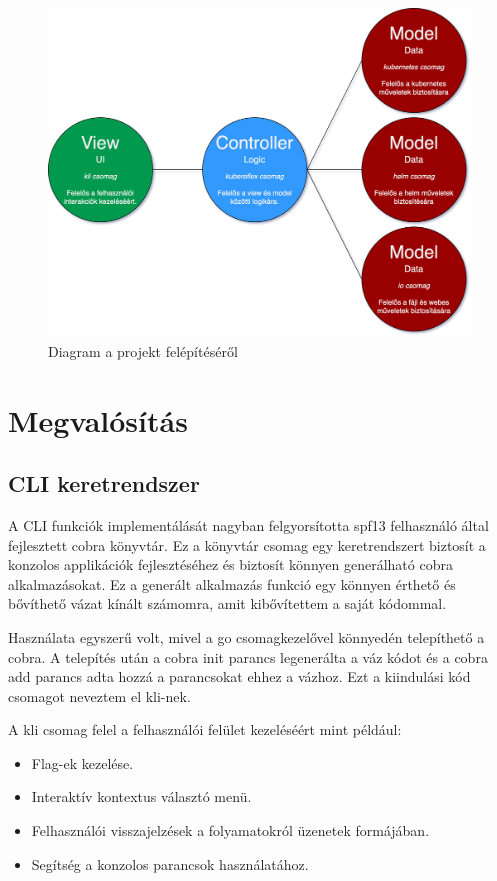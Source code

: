 \begin{figure}[ht]
  \centering
       \includegraphics[width=1.0\textwidth]{figures/kli/kli-mvc.png}
        \caption{Diagram a projekt felépítéséről}
         \label{kli-mvc}
\end{figure}

\section{Megvalósítás}

\subsection{CLI keretrendszer}
A CLI funkciók implementálását nagyban felgyorsította spf13 felhasználó által fejlesztett cobra könyvtár.
Ez a könyvtár csomag egy keretrendszert biztosít a konzolos applikációk fejlesztéséhez és biztosít könnyen generálható cobra alkalmazásokat.
Ez a generált alkalmazás funkció egy könnyen érthető és bővíthető vázat kínált számomra, amit kibővítettem a saját kódommal.

Használata egyszerű volt, mivel a go csomagkezelővel könnyedén telepíthető a cobra.
A telepítés után a cobra init parancs legenerálta a váz kódot és a cobra add parancs adta hozzá a parancsokat ehhez a vázhoz.
Ezt a kiindulási kód csomagot neveztem el kli-nek.

\newpage

A kli csomag felel a felhasználói felület kezeléséért mint például:
\begin{itemize}
    \item Flag-ek kezelése.
    \item Interaktív kontextus választó menü.
    \item Felhasználói visszajelzések a folyamatokról üzenetek formájában.
    \item Segítség a konzolos parancsok használatához.
\end{itemize}

